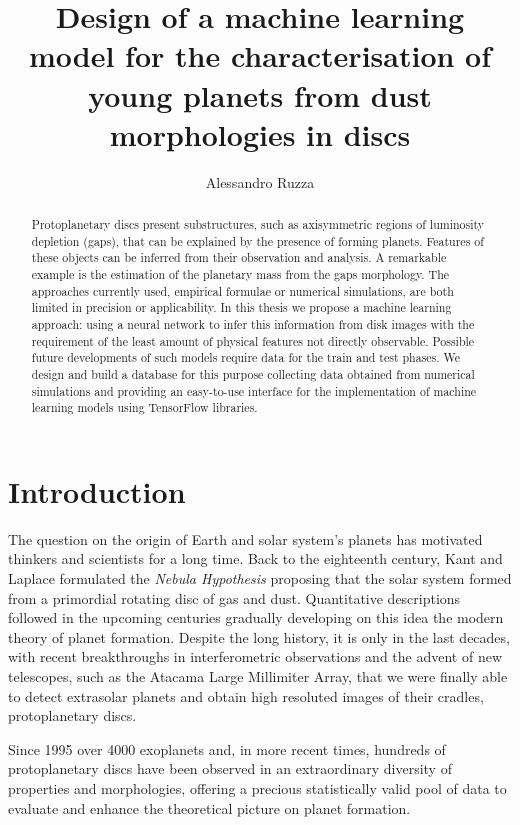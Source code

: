 \documentclass[a4paper,10pt]{report}
\title{Design of a machine learning model for the characterisation of young planets from dust morphologies in discs}
\author{Alessandro Ruzza}
\begin{document}


\begin{abstract}
    Protoplanetary discs present substructures,
    such as axisymmetric regions of luminosity depletion (gaps),
    that can be explained by the presence of forming planets. 
    Features of these objects can be inferred from their
    observation and analysis. A remarkable example is the 
    estimation of the planetary mass from the gaps morphology.
    The approaches currently used, empirical formulae or numerical
    simulations, are both limited in precision or applicability.
    In this thesis we propose a machine learning approach:
    using a neural network to infer this information from 
    disk images with the requirement of the least amount
    of physical features not directly observable.
    Possible future developments of such models require 
    data for the train and test phases.
    We design and build a database for this purpose collecting 
    data obtained from numerical simulations and providing an 
    easy-to-use interface for the implementation of machine learning
    models using TensorFlow libraries.
\end{abstract}

\tableofcontents

\chapter{Introduction}

The question on the origin of Earth and solar system's planets has motivated 
thinkers and scientists for a long time.
Back to the eighteenth century, Kant and Laplace formulated the
\emph{Nebula Hypothesis} proposing that the solar system
formed from a primordial rotating disc of gas and dust. Quantitative descriptions followed in the upcoming centuries 
gradually developing on this idea the modern theory of planet formation.
Despite the long history, it is only in the last decades,
with recent breakthroughs in interferometric observations 
and the advent of new telescopes, such as the Atacama Large Millimiter Array, that we were
finally able to detect extrasolar planets and obtain high resoluted images of their
cradles, protoplanetary discs.

Since 1995 over 4000 exoplanets and, in more recent times, hundreds of protoplanetary discs have been observed in an extraordinary 
diversity of properties and morphologies, 
offering a precious statistically valid pool of data to evaluate and enhance
the theoretical picture on planet formation.
\end{document}
